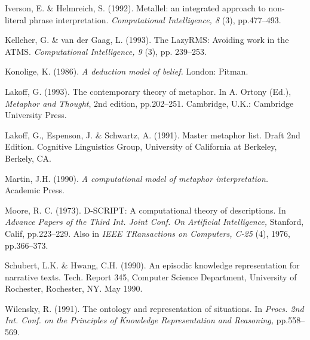 Iverson, E. \& Helmreich, S. (1992).  
Metallel: an integrated approach to non-literal phrase interpretation.  
{\it Computational Intelligence, 8} (3), pp.477--493.


Kelleher, G. \& van der Gaag, L. (1993).
The LazyRMS: Avoiding work in the ATMS.
{\it Computational Intelligence, 9} (3), pp. 239--253.


Konolige, K. (1986).
{\it A deduction model of belief.} London: Pitman.


Lakoff, G. (1993). 
The contemporary theory of metaphor. 
In A. Ortony (Ed.), {\it Metaphor and Thought}, 2nd edition, pp.202--251. 
Cambridge, U.K.: Cambridge University Press. 


Lakoff, G.,  Espenson, J. \& Schwartz, A. (1991).
Master metaphor list. Draft 2nd Edition.
Cognitive Linguistics Group, University of California at Berkeley, Berkely, CA.


Martin, J.H. (1990).
{\it A computational model of metaphor interpretation.}
Academic Press.


Moore, R. C. (1973).
D-SCRIPT: A computational theory of descriptions.
In {\it Advance Papers of the Third Int. Joint Conf. On Artificial Intelligence, } Stanford, Calif, pp.223--229.
Also in {\it IEEE TRansactions on Computers, C-25} (4), 1976, pp.366--373.


Schubert, L.K. \& Hwang, C.H. (1990).  
An episodic knowledge representation for narrative texts.  
Tech. Report 345, Computer Science Department, University of Rochester, Rochester, NY. May 1990.

Wilensky, R. (1991).
The ontology and representation of situations.
In {\it Procs. 2nd Int. Conf. on the Principles of Knowledge Representation and Reasoning,} pp.558--569.



 
 
